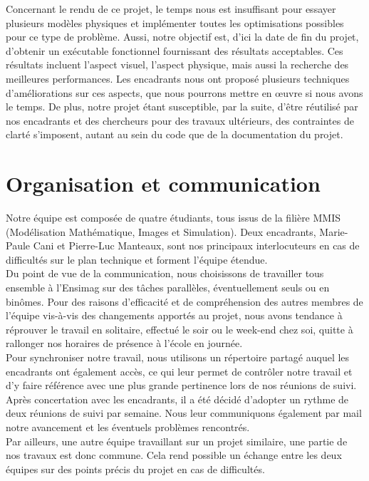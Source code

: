 \documentclass[a4paper,11pt]{article}
\begin{document}
Concernant le rendu de ce projet, le temps nous est insuffisant pour essayer plusieurs modèles physiques et implémenter toutes les optimisations possibles pour ce type de problème. Aussi, notre objectif est, d'ici la date de fin du projet, d'obtenir un exécutable fonctionnel fournissant des résultats acceptables. Ces résultats incluent l'aspect visuel, l'aspect physique, mais aussi la recherche des meilleures performances. Les encadrants nous ont proposé plusieurs techniques d'améliorations sur ces aspects, que nous pourrons mettre en \oe{}uvre si nous avons le temps. De plus, notre projet étant susceptible, par la suite, d'être réutilisé par nos encadrants et des chercheurs pour des travaux ultérieurs, des contraintes de clarté s'imposent, autant au sein du code que de la documentation du projet. 

\newpage

\section{Organisation et communication}

Notre équipe est composée de quatre étudiants, tous issus de la filière MMIS (Modélisation Mathématique, Images et Simulation). Deux encadrants, Marie-Paule Cani et Pierre-Luc Manteaux, sont nos principaux interlocuteurs en cas de difficultés sur le plan technique et forment l'équipe étendue. \\

Du point de vue de la communication, nous choisissons de travailler tous ensemble à l'Ensimag sur des tâches parallèles, éventuellement seuls ou en binômes. Pour des raisons d'efficacité et de compréhension des autres membres de l'équipe vis-à-vis des changements apportés au projet, nous avons tendance à réprouver le travail en solitaire, effectué le soir ou le week-end chez soi, quitte à rallonger nos horaires de présence à l'école en journée. \\

Pour synchroniser notre travail, nous utilisons un répertoire partagé auquel les encadrants ont également accès, ce qui leur permet de contrôler notre travail et d'y faire référence avec une plus grande pertinence lors de nos réunions de suivi. Après concertation avec les encadrants, il a été décidé d'adopter un rythme de deux réunions de suivi par semaine. Nous leur communiquons également par mail notre avancement et les éventuels problèmes rencontrés. \\

Par ailleurs, une autre équipe travaillant sur un projet similaire, une partie de nos travaux est donc commune. Cela rend possible un échange entre les deux équipes sur des points précis du projet en cas de difficultés.
\end{document}
